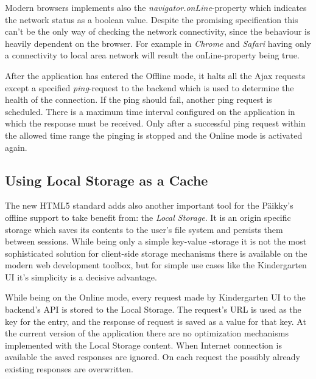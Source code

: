 Modern browsers implements also the \textit{navigator.onLine}-property which indicates the network status as a boolean value. Despite the promising specification this can't be the only way of checking the network connectivity, since the behaviour is heavily dependent on the browser. For example in \textit{Chrome} and \textit{Safari} having only a connectivity to local area network will result the onLine-property being true. \cite{_window.navigator.online_????}

After the application has entered the Offline mode, it halts all the Ajax requests except a specified \textit{ping}-request to the backend which is used to determine the health of the connection. If the ping should fail, another ping request is scheduled. There is a maximum time interval configured on the application in which the response must be received. Only after a successful ping request within the allowed time range the pinging is stopped and the Online mode is activated again.





\subsection{Using Local Storage as a Cache}
\label{subsec:localstorage}

The new HTML5 standard adds also another important tool for the Päikky's offline support to take benefit from: the \textit{Local Storage}. It is an origin specific storage which saves its contents to the user's file system and persists them between sessions. While being only a simple key-value -storage it is not the most sophisticated solution for client-side storage mechanisms there is available on the modern web development toolbox, but for simple use cases like the Kindergarten UI it's simplicity is a decisive advantage.

While being on the Online mode, every request made by Kindergarten UI to the backend's API is stored to the Local Storage. The request's URL is used as the key for the entry, and the response of request is saved as a value for that key. At the current version of the application there are no optimization mechanisms implemented with the Local Storage content. When Internet connection is available the saved responses are ignored. On each request the possibly already existing responses are overwritten.

